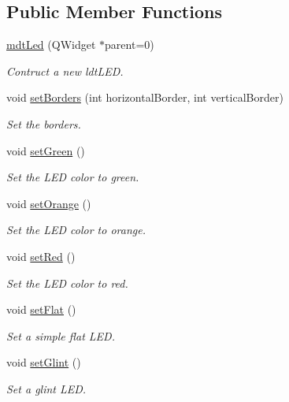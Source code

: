 \subsection*{Public Member Functions}
\begin{DoxyCompactItemize}
\item 
\hyperlink{classmdt_led_a64d5de3a8c2e4937d9ca9328b5ae4f9c}{mdtLed} (QWidget $\ast$parent=0)
\begin{DoxyCompactList}\small\item\em Contruct a new ldtLED. \end{DoxyCompactList}\item 
void \hyperlink{classmdt_led_a1271e1dfe07e8ff459d7f20e55ab3bc4}{setBorders} (int horizontalBorder, int verticalBorder)
\begin{DoxyCompactList}\small\item\em Set the borders. \end{DoxyCompactList}\item 
void \hyperlink{classmdt_led_a5f3b4975c423ac35442ec2b9c546b0e4}{setGreen} ()
\begin{DoxyCompactList}\small\item\em Set the LED color to green. \end{DoxyCompactList}\item 
void \hyperlink{classmdt_led_a5cdd40d1e3baefab72d9cda866353797}{setOrange} ()
\begin{DoxyCompactList}\small\item\em Set the LED color to orange. \end{DoxyCompactList}\item 
void \hyperlink{classmdt_led_a28e208fb105c99b21d81d4c82ed50a98}{setRed} ()
\begin{DoxyCompactList}\small\item\em Set the LED color to red. \end{DoxyCompactList}\item 
void \hyperlink{classmdt_led_a664ca4c83ec0faaa86bd3f932fb06d5b}{setFlat} ()
\begin{DoxyCompactList}\small\item\em Set a simple flat LED. \end{DoxyCompactList}\item 
void \hyperlink{classmdt_led_a8ec814fdc4910476e7479649ba3f6204}{setGlint} ()
\begin{DoxyCompactList}\small\item\em Set a glint LED. \end{DoxyCompactList}\item 

\end{DoxyCompactItemize}
